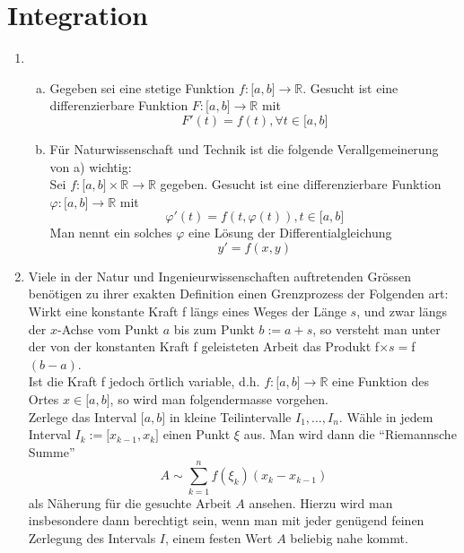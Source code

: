 \chapter{Integration}

\begin{enumerate}[\indent I)]
\item \begin{enumerate}[a)]
\item Gegeben sei eine stetige Funktion $f : \lbrack a,b\rbrack \rightarrow \mathbb{R}$. Gesucht ist eine differenzierbare Funktion $F: \lbrack a,b\rbrack \rightarrow \mathbb{R}$ mit $$F'(t)=f(t), \forall t \in \lbrack a,b \rbrack$$
\item Für Naturwissenschaft und Technik ist die folgende Verallgemeinerung von a) wichtig:\\
Sei $f:\lbrack a,b\rbrack \times \mathbb{R} \rightarrow \mathbb{R}$ gegeben. Gesucht ist eine differenzierbare Funktion $\varphi : \lbrack a,b\rbrack \rightarrow \mathbb{R}$ mit $$\varphi ' (t)=f(t,\varphi (t)), t\in \lbrack a,b \rbrack$$ Man nennt ein solches $\varphi$ eine Lösung der Differentialgleichung $$y'=f(x,y)$$
\end{enumerate}
\item Viele in der Natur und Ingenieurwissenschaften auftretenden Grössen benötigen zu ihrer exakten Definition einen Grenzprozess der Folgenden art: \\
Wirkt eine konstante Kraft f längs eines Weges der Länge $s$, und zwar längs der $x$-Achse vom Punkt $a$ bis zum Punkt $b:=a+s$, so versteht man unter der von der konstanten Kraft f geleisteten Arbeit das Produkt f$\times s=$f$(b-a)$. \\
Ist die Kraft f jedoch örtlich variable, d.h. $f:\lbrack a,b\rbrack \rightarrow \mathbb{R}$ eine Funktion des Ortes $x \in \lbrack a,b\rbrack$, so wird man folgendermasse vorgehen.\\

Zerlege das Interval $\lbrack a,b\rbrack$ in kleine Teilintervalle $I_{1},\dots, I_{n}$. Wähle in jedem Interval $I_{k}:=\lbrack x_{k-1}, x_{k}\rbrack$ einen Punkt $\xi$ aus. Man wird dann die ``Riemannsche Summe'' $$A \sim  \sum\limits_{k = 1}^n {f({\xi_k})({x_k} - {x_{k - 1}})} $$  als Näherung für die gesuchte Arbeit $A$ ansehen. Hierzu wird man insbesondere dann berechtigt sein, wenn man mit jeder genügend feinen Zerlegung des Intervals $I$, einem festen Wert $A$ beliebig nahe kommt. 


\end{enumerate}
